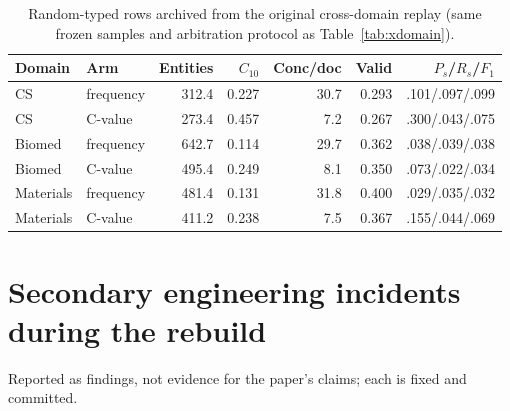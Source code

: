 \documentclass[preprint,12pt]{elsarticle}
\begin{document}
\begin{table}[t]
\centering
\caption{Random-typed rows archived from the original cross-domain
replay (same frozen samples and arbitration protocol as
Table~\ref{tab:xdomain}).}
\label{tab:xdomain-rand}
\small
\begin{tabular}{@{}llrrrrr@{}}
\toprule
Domain & Arm & Entities & $C_{10}$ & Conc/doc & Valid & $P_{s}$/$R_{s}$/$F_1$ \\
\midrule
CS & frequency & 312.4 & 0.227 & 30.7 & 0.293 & .101/.097/.099 \\
CS & C-value & 273.4 & 0.457 & 7.2 & 0.267 & .300/.043/.075 \\
Biomed & frequency & 642.7 & 0.114 & 29.7 & 0.362 & .038/.039/.038 \\
Biomed & C-value & 495.4 & 0.249 & 8.1 & 0.350 & .073/.022/.034 \\
Materials & frequency & 481.4 & 0.131 & 31.8 & 0.400 & .029/.035/.032 \\
Materials & C-value & 411.2 & 0.238 & 7.5 & 0.367 & .155/.044/.069 \\
\bottomrule
\end{tabular}
\end{table}

\section{Secondary engineering incidents during the rebuild}
\label{app:incidents}

Reported as findings, not evidence for the paper's claims; each is
fixed and committed.
\end{document}
